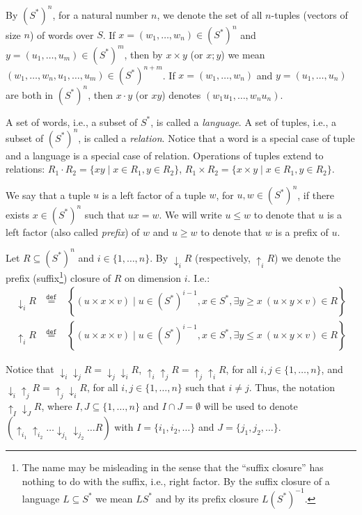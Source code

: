 \documentclass{llncs}
\newcommand{\out}[1]{}
\newcommand{\df}[1]{\ \stackrel{\mathtt{def}}{#1}\ }
\begin{document}
By $(S^\ast)^n$, for a natural number $n$, we denote the set of all
$n$-tuples (vectors of size $n$) of words over $S$. If
$x=(w_1,\ldots,w_n)\in (S^\ast)^n$ and $y=(u_1,\ldots,u_m)\in
(S^\ast)^m$, then by $x\times y$ (or $x;y$) we mean
$(w_1,\ldots,w_n,u_1,\ldots,u_m)\in (S^\ast)^{n+m}$. If
$x=(w_1,\ldots,w_n)$ and $y=(u_1,\ldots,u_n)$ are both in
$(S^\ast)^n$, then $x\cdot y$ (or $xy$) denotes
$(w_1u_1,\ldots,w_nu_n)$. 

A set of words, i.e., a subset of $S^\ast$, is called a
\emph{language}. A set of tuples, i.e., a subset of $(S^\ast)^n$, is
called a \emph{relation}. Notice that a word is a special case of
tuple and a language is a special case of relation. Operations of
tuples extend to relations: $R_1\cdot R_2 = \{ xy \mid x\in R_1,
y\in R_2\}$, $R_1\times R_2 =  \{ x\times y \mid x\in R_1,
y\in R_2\}$.

We say that a tuple $u$ is a left factor of a tuple $w$, for $u,w\in
(S^\ast)^n$, if there exists $x\in(S^\ast)^n$ such that $ux=w$. We
will write $u\leq w$ to denote that $u$ is a left factor (also called
\emph{prefix}) of $w$ and $u\geq w$ to denote that $w$ is a prefix of $u$.

Let $R\subseteq (S^\ast)^n$ and $i\in\{1,\ldots,n\}$. By
${\downarrow_i}R$ (respectively, ${\uparrow_i}R$) we denote the prefix
(suffix\footnote{The name may be misleading in the sense that the
  ``suffix closure'' has nothing to do with the suffix, i.e., right
  factor. By the suffix closure of a language $L\subseteq S^\ast$ we
  mean $LS^\ast$ and by its prefix closure $L (S^\ast)^{-1}$.})
closure of $R$ on dimension $i$. I.e.:
\begin{eqnarray*}
  {\downarrow_i}R & \df{=} & 
  \left\{ (u\times x\times v) \mid u\in  (S^\ast)^{i-1}, x\in S^\ast, 
    \exists y \geq x ~ (u\times y\times v) \in R\right\} 
\out{ \\
  &  & \mbox{or, equivalently: }
  {\downarrow_i}R\df{=}R\cdot
  \left(\{\varepsilon^{i-1}\}\times S^\ast \times \{\varepsilon^{n-i}\}\right)^{-1}
}
\\
  {\uparrow_i}R & \df{=} & 
  \left\{ (u\times x\times v) \mid u\in  (S^\ast)^{i-1}, x\in S^\ast, 
    \exists y \leq x ~ (u\times y\times v) \in R\right\}
\out{
  \\
  & &\mbox{or, equivalently: }{\uparrow_i}R \df{=}
  R\cdot\left(\{\varepsilon^{i-1}\}\times S^\ast \times \{\varepsilon^{n-i}\}\right) 
}
\end{eqnarray*}

Notice that ${\downarrow_i\downarrow_j}R =
{\downarrow_j\downarrow_i}R$, ${\uparrow_i\uparrow_j}R =
{\uparrow_j\uparrow_i}R$, for all $i,j\in\{1,\ldots,n\}$, and
${\downarrow_i\uparrow_j}R = {\uparrow_j\downarrow_i}R$, for all
$i,j\in\{1,\ldots,n\}$ such that $i\neq j$. Thus, the notation
${\uparrow_{I}\downarrow_{J}}R$, where $I,J\subseteq\{1,\ldots,n\}$
and $I\cap J=\emptyset$ will be used to denote
$({\uparrow_{i_1}\uparrow_{i_2}\ldots\downarrow_{j_1}\downarrow_{j_2}\ldots}R)$
with $I=\{i_1,i_2,\ldots\}$ and $J=\{j_1,j_2,\ldots\}$.
\end{document}
